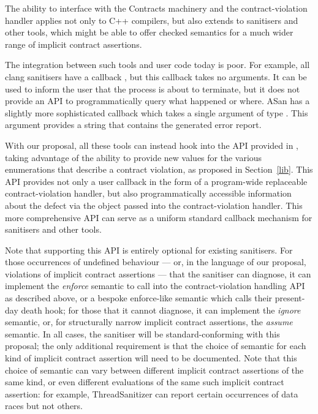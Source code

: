 The ability to interface with the Contracts machinery and the contract-violation handler applies not only to C++ compilers, but also extends to sanitisers and other tools, which might be able to offer checked semantics for a much wider range of implicit contract assertions.

The integration between such tools and user code today is poor. For example, all clang sanitisers have a callback , but this callback takes no arguments. It can be used to inform the user that the process is about to terminate, but it does not provide an API to programmatically query what happened or where. ASan has a slightly more sophisticated callback  which takes a single argument of type . This argument provides a string that contains the generated error report.

With our proposal, all these tools can instead hook into the API provided in \cite{P2900R9}, taking advantage of the ability to provide new values for the various enumerations that describe a contract violation, as proposed in Section~\ref{lib}. This API provides not only a user callback in the form of a  program-wide replaceable contract-violation handler, but also programmatically accessible information about the defect via the  \mbox{} object passed into the contract-violation handler. This more comprehensive API can serve as a uniform standard callback mechanism for sanitisers and other tools.

Note that supporting this API is entirely optional for existing sanitisers. For those occurrences of undefined behaviour --- or, in the language of our proposal, violations of implicit contract assertions --- that the sanitiser can diagnose, it can implement the \emph{enforce} semantic to call into the contract-violation handling API as described above, or a bespoke enforce-like semantic which calls their present-day death hook; for those that it cannot diagnose, it can implement the \emph{ignore} semantic, or, for structurally narrow implicit contract assertions, the \emph{assume} semantic. In all cases, the sanitiser will be standard-conforming with this proposal; the only additional requirement is that the choice of semantic for each kind of implicit contract assertion will need to be documented. Note that this choice of semantic can vary between different implicit contract assertions of the same kind, or even different evaluations of the same such implicit contract assertion: for example, ThreadSanitizer can report certain occurrences of data races but not others.

